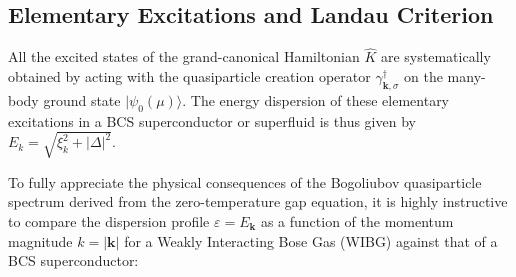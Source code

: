 \subsection{Elementary Excitations and Landau Criterion}

All the excited states of the grand-canonical Hamiltonian \( \hat{K} \) are systematically obtained by acting with the quasiparticle creation operator \( \gamma_{\mathbf{k},\sigma}^\dagger \) on the many-body ground state \( |\psi_0(\mu)\rangle \). The energy dispersion of these elementary excitations in a BCS superconductor or superfluid is thus given by \( E_k = \sqrt{\xi_k^2 + |\Delta|^2} \).

To fully appreciate the physical consequences of the Bogoliubov quasiparticle spectrum derived from the zero-temperature gap equation, it is highly instructive to compare the dispersion profile \( \varepsilon = E_{\mathbf{k}} \) as a function of the momentum magnitude \( k = |\mathbf{k}| \) for a Weakly Interacting Bose Gas (WIBG) against that of a BCS superconductor:
